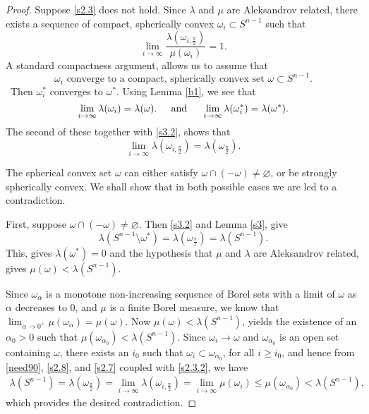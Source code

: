 \documentclass{cpamart1}     %
\theoremstyle{definition}
\theoremstyle{remark}
\newcommand{\sn}{S^{n-1}}
\begin{document}
\begin{proof}
Suppose \eqref{s2.3} does not hold. Since $\lambda$ and $\mu$ are Aleksandrov related, there exists a sequence
of compact, spherically convex $\omega_i\subset\sn$ such that
\begin{equation}\label{s2.7}
\lim_{i\to \infty} \frac{\lambda(\omega_{i,\frac\pi2})}{\mu(\omega_i)} =1.
\end{equation}
A standard compactness argument, allows us to assume that
\begin{equation}\label{new55}
\omega_i \text{ converge to a compact, spherically convex set } \omega \subset \sn.
\end{equation}\
Then $\omega_i^*$ converges to $\omega^*$.
Using Lemma \ref{b1}, we see that
\begin{equation*}
\text{$
\lim_{i\to \infty} \lambda(\omega_{i}) = \lambda(\omega)$.
\quad and \quad\
$\lim_{i\to \infty} \lambda(\omega_{i}^*) = \lambda(\omega^*).
$}
\end{equation*}
The second of these together with \eqref{s3.2}, shows that
\begin{equation}\label{s2.8}
\lim_{i\to \infty} \lambda(\omega_{i,\frac\pi2}) = \lambda(\omega_{\frac\pi2}).
\end{equation}

The spherical convex set $\omega$ can either satisfy
$\omega \cap (-\omega) \neq \varnothing$, or be
strongly spherically convex. We shall show that in both possible cases we are led to a contradiction.

First, suppose  $\omega \cap (-\omega) \neq \varnothing$. Then \eqref{s3.2} and Lemma \ref{s3}, give
\begin{equation}\label{need90}
\lambda(\sn \setminus \omega^*) = \lambda(\omega_{\frac\pi2}) = \lambda(\sn).
\end{equation}
This, gives $\lambda(\omega^*)=0$ and the hypothesis that $\mu$ and $\lambda$ are
 Aleksandrov related, gives
$\mu(\omega) < \lambda(\sn)$.

Since $\omega_\alpha$ is a monotone non-increasing sequence of Borel sets with a limit
 of $\omega$ as $\alpha$ decreases to 0, and $\mu$ is a finite Borel measure, we know that
  $\lim_{\alpha \to 0^+} \mu(\omega_\alpha) = \mu(\omega)$. Now $\mu(\omega) < \lambda(\sn)$,
  yields the existence of an $\alpha_0>0$ such that $\mu(\omega_{\alpha_0}) < \lambda(\sn).$
  Since $\omega_i\to\omega$ and $\omega_{\alpha_0}$ is an open set containing $\omega$,
  there exists an $i_0$ such that $\omega_i\subset \omega_{\alpha_0}$, for all $i\ge i_0$,
and hence
from \eqref{need90}, \eqref{s2.8}, and \eqref{s2.7} coupled with \eqref{s2.3.2}, we have
\begin{align*}
\lambda(\sn) = \lambda(\omega_{\frac\pi2})
=\lim_{i\to \infty} \lambda(\omega_{i,\frac\pi2})
=\lim_{i\to \infty} \mu(\omega_i)
\le \mu(\omega_{\alpha_0})
<\lambda(\sn),
\end{align*}
which provides the desired contradiction.




\end{proof}
\end{document}
